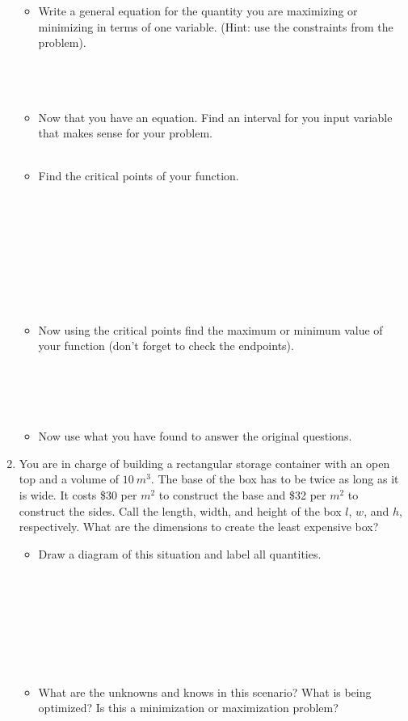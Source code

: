 \documentclass[12pt]{article}
\begin{document}
\begin{enumerate}
\begin{itemize}
        \item Write a general equation for the quantity you are maximizing or minimizing in terms of one variable. (Hint: use the constraints from the problem).\\\\\\\\

        \item Now that you have an equation. Find an interval for you input variable that makes sense for your problem. \\\\
        
        \item Find the critical points of your function.\\\\\\\\\\\\\\\\\\

        \item Now using the critical points find the maximum or minimum value of your function (don't forget to check the endpoints).\\\\\\\\\\

        \item Now use what you have found to answer the original questions.
    \end{itemize}
    \newpage
    \item You are in charge of building a rectangular storage container with an open top and a volume of $10\ m^{3}$. The base of the box has to be twice as long as it is wide. It costs \$30 per $m^{2}$ to construct the base and \$32 per $m^{2}$ to construct the sides. Call the length, width, and height of the box $l$, $w$, and $h$, respectively. What are the dimensions to create the least expensive box?
    \begin{itemize}
        \item Draw a diagram of this situation and label all quantities.\\\\\\\\\\\\\\\\
        \item What are the unknowns and knows in this scenario? What is being optimized? Is this a minimization or maximization problem?\\\\\\



\end{itemize}
\end{enumerate}
\end{document}
